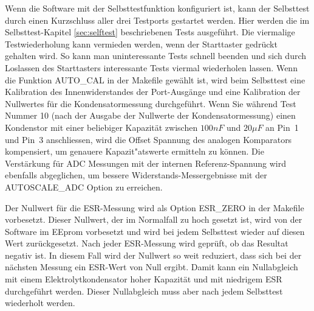 Wenn die Software mit der Selbsttestfunktion konfiguriert ist, kann der Selbsttest durch einen Kurzschluss aller drei
Testports gestartet werden.
Hier werden die im Selbsttest-Kapitel \ref{sec:selftest} beschriebenen Tests ausgeführt. Die viermalige Testwiederholung
kann vermieden werden, wenn der Starttaster gedrückt gehalten wird. So kann man uninteressante Tests schnell beenden und
sich durch Loslassen des Starttasters interessante Tests viermal wiederholen lassen.
Wenn die Funktion AUTO\_CAL in der Makefile gewählt ist, wird beim Selbsttest
eine Kalibration des Innenwiderstandes der Port-Ausgänge und
eine Kalibration der Nullwertes für die Kondensatormessung durchgeführt.
Wenn Sie während Test Nummer 10 (nach der Ausgabe der Nullwerte der Kondensatormessung) einen Kondenstor mit einer beliebiger Kapazität zwischen \(100 nF\) und \(20 \mu F\) an Pin~1 und Pin~3  anschliessen,
wird die Offset Spannung des analogen Komparators kompensiert, um genauere Kapazit"atswerte ermitteln zu können.
Die Verstärkung für ADC Messungen mit der internen Referenz-Spannung wird ebenfalls abgeglichen, um
bessere Widerstands-Messergebnisse mit der AUTOSCALE\_ADC Option zu erreichen.


Der Nullwert für die ESR-Messung wird als Option ESR\_ZERO in der Makefile vorbesetzt. Dieser Nullwert, der im
Normalfall zu hoch gesetzt ist, wird von der Software im EEprom vorbesetzt und wird bei jedem Selbsttest
wieder auf diesen Wert zurückgesetzt.
Nach jeder ESR-Messung wird geprüft, ob das Resultat negativ ist. In diesem Fall wird der Nullwert so weit
reduziert, dass sich bei der nächsten Messung ein ESR-Wert von Null ergibt. Damit kann ein Nullabgleich mit
einem Elektrolytkondensator hoher Kapazität und mit niedrigem ESR durchgeführt werden.
Dieser Nullabgleich muss aber nach jedem Selbsttest wiederholt werden.
